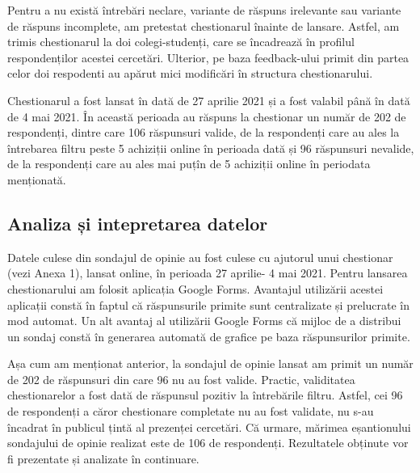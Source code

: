 \documentclass[a4paper, 12pt]{article}
\begin{document}
	\quad Pentru a nu există întrebări neclare, variante de răspuns irelevante sau variante de răspuns incomplete, am pretestat chestionarul înainte de lansare. Astfel, am trimis chestionarul la doi colegi-studenți, care se încadrează în profilul respondenților acestei cercetări. Ulterior, pe baza feedback-ului primit din partea celor doi respodenti au apărut mici modificări în structura chestionarului.

	\quad Chestionarul a fost lansat în dată de 27 aprilie 2021 și a fost valabil până în dată de 4 mai 2021. În această perioada au răspuns la chestionar un număr de 202 de respondenți, dintre care 106 răspunsuri valide, de la respondenți care au ales la întrebarea filtru peste 5 achiziții online în perioada dată și 96 răspunsuri nevalide, de la respondenți care au ales mai puțîn de 5 achiziții online în periodata menționată.
	
		
	\subsection{Analiza și intepretarea datelor}
		\qquad\space Datele culese din sondajul de opinie au fost culese cu ajutorul unui chestionar (vezi Anexa 1), lansat online, în perioada 27 aprilie- 4 mai 2021. Pentru lansarea chestionarului am folosit aplicația Google Forms. Avantajul utilizării acestei aplicații constă în faptul că răspunsurile primite sunt centralizate și prelucrate în mod automat. Un alt avantaj al utilizării Google Forms că mijloc de a distribui un sondaj constă în generarea automată de grafice pe baza răspunsurilor primite. 
		
		\qquad Așa cum am menționat anterior, la sondajul de opinie lansat am primit un număr de 202 de răspunsuri din care 96 nu au fost valide. Practic, validitatea chestionarelor a fost dată de răspunsul pozitiv la întrebările filtru. Astfel, cei 96 de respondenți a căror chestionare completate nu au fost validate, nu s-au încadrat în publicul țintă al prezenței cercetări.  Că urmare, mărimea eșantionului sondajului de opinie realizat este de 106 de respondenți. Rezultatele obținute vor fi prezentate și analizate în continuare.
		
\end{document}
